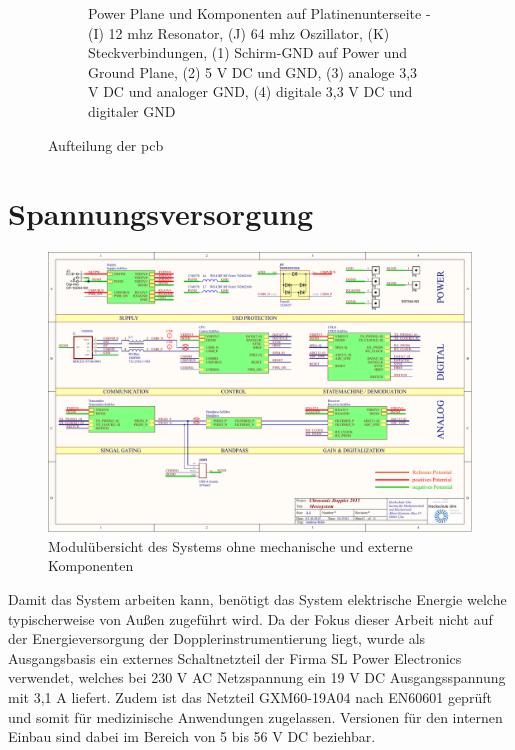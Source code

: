\begin{figure}[h!]
\begin{subfigure}[t]{0.46\textwidth}
\begin{annotatedFigure}
\end{annotatedFigure}
	\caption{Power Plane und Komponenten auf Platinenunterseite - (I) 12 \ac{mhz} Resonator, (J) 64 \ac{mhz} Oszillator, (K) Steckverbindungen, (1) Schirm-GND auf Power und Ground Plane, (2) 5 V DC und GND, (3) analoge 3,3 V DC und analoger GND, (4) digitale 3,3 V DC und digitaler GND}
    \end{subfigure}
    \caption{Aufteilung der \acs{pcb}}
\end{figure}
\hfill
\section{Spannungsversorgung}\label{sec:supply}
\begin{figure}[!h]
	\centering
   	\includegraphics[page=2,width=1.0\textwidth, trim= 5mm 48mm 5mm 5mm, clip=true]{images/pcb/new.PDF}%
    \caption{Modulübersicht des Systems ohne mechanische und externe Komponenten}
    \label{fig:system}
\end{figure}
Damit das System arbeiten kann, benötigt das System elektrische Energie welche typischerweise von Außen zugeführt wird. Da der Fokus dieser Arbeit nicht auf der Energieversorgung der Dopplerinstrumentierung liegt, wurde als Ausgangsbasis ein externes Schaltnetzteil der Firma SL Power Electronics verwendet, welches bei 230 V AC Netzspannung ein 19 V DC Ausgangsspannung mit 3,1 A liefert. Zudem ist das Netzteil GXM60-19A04 nach EN60601 geprüft und somit für medizinische Anwendungen zugelassen. Versionen für den internen Einbau sind dabei im Bereich von 5 bis 56 V DC beziehbar.\cite{slpower}\\
